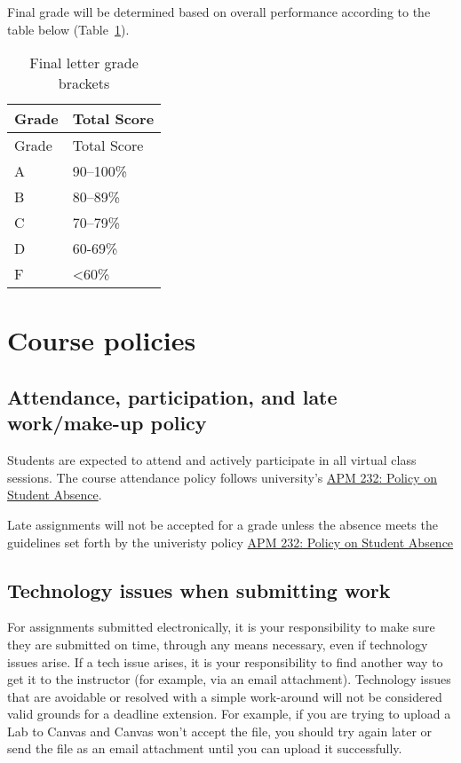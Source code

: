 Final grade will be determined based on overall performance according to
the table below (Table~\ref{tbl:letter-grades}).

\hypertarget{tbl:letter-grades}{}
\begin{longtable}[]{@{}ll@{}}
\caption{\label{tbl:letter-grades}Final letter grade
brackets}\tabularnewline
\toprule
Grade & Total Score \\
\midrule
\endfirsthead
\toprule
Grade & Total Score \\
\midrule
\endhead
A & 90--100\% \\
B & 80--89\% \\
C & 70--79\% \\
D & 60-69\% \\
F & \textless60\% \\
\bottomrule
\end{longtable}

\hypertarget{sec:course-policies}{%
\section{Course policies}\label{sec:course-policies}}

\hypertarget{sec:attendance-participation-and-late-workmake-up-policy}{%
\subsection{Attendance, participation, and late work/make-up
policy}\label{sec:attendance-participation-and-late-workmake-up-policy}}

Students are expected to attend and actively participate in all virtual
class sessions. The course attendance policy follows university's
\href{http://www.fresnostate.edu/academics/facultyaffairs/documents/apm/232.pdf}{APM
232: Policy on Student Absence}.

Late assignments will not be accepted for a grade unless the absence
meets the guidelines set forth by the univeristy policy
\href{http://www.fresnostate.edu/academics/facultyaffairs/documents/apm/232.pdf}{APM
232: Policy on Student Absence}

\hypertarget{sec:technology-issues-when-submitting-work}{%
\subsection{Technology issues when submitting
work}\label{sec:technology-issues-when-submitting-work}}

For assignments submitted electronically, it is your responsibility to
make sure they are submitted on time, through any means necessary, even
if technology issues arise. If a tech issue arises, it is your
responsibility to find another way to get it to the instructor (for
example, via an email attachment). Technology issues that are avoidable
or resolved with a simple work-around will not be considered valid
grounds for a deadline extension. For example, if you are trying to
upload a Lab to Canvas and Canvas won't accept the file, you should try
again later or send the file as an email attachment until you can upload
it successfully.

